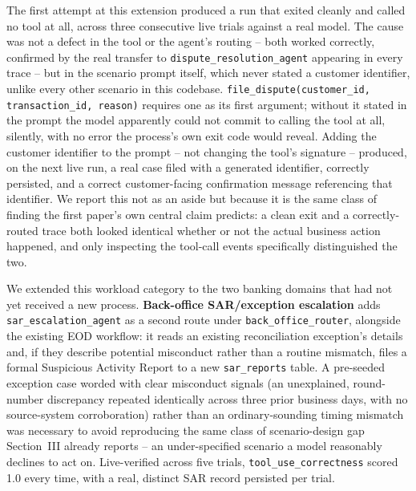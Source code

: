 \documentclass[conference]{IEEEtran}
\begin{document}
The first attempt at this extension produced a run that exited cleanly and called no tool at all, across three consecutive live trials against a real model. The cause was not a defect in the tool or the agent's routing -- both worked correctly, confirmed by the real transfer to \texttt{dispute\_resolution\_agent} appearing in every trace -- but in the scenario prompt itself, which never stated a customer identifier, unlike every other scenario in this codebase. \texttt{file\_dispute(customer\_id, transaction\_id, reason)} requires one as its first argument; without it stated in the prompt the model apparently could not commit to calling the tool at all, silently, with no error the process's own exit code would reveal. Adding the customer identifier to the prompt -- not changing the tool's signature -- produced, on the next live run, a real case filed with a generated identifier, correctly persisted, and a correct customer-facing confirmation message referencing that identifier. We report this not as an aside but because it is the same class of finding the first paper's own central claim predicts: a clean exit and a correctly-routed trace both looked identical whether or not the actual business action happened, and only inspecting the tool-call events specifically distinguished the two.

We extended this workload category to the two banking domains that had not yet received a new process. \textbf{Back-office SAR/exception escalation} adds \texttt{sar\_escalation\_agent} as a second route under \texttt{back\_office\_router}, alongside the existing EOD workflow: it reads an existing reconciliation exception's details and, if they describe potential misconduct rather than a routine mismatch, files a formal Suspicious Activity Report to a new \texttt{sar\_reports} table. A pre-seeded exception case worded with clear misconduct signals (an unexplained, round-number discrepancy repeated identically across three prior business days, with no source-system corroboration) rather than an ordinary-sounding timing mismatch was necessary to avoid reproducing the same class of scenario-design gap Section~III already reports -- an under-specified scenario a model reasonably declines to act on. Live-verified across five trials, \texttt{tool\_use\_correctness} scored 1.0 every time, with a real, distinct SAR record persisted per trial.
\end{document}
